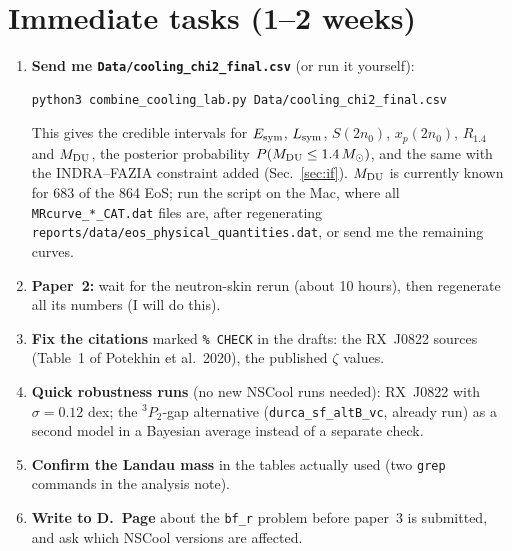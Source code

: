 \documentclass[11pt,a4paper]{article}
\newcommand{\Esym}{E_{\rm sym}}
\newcommand{\Lsym}{L_{\rm sym}}
\newcommand{\Msun}{M_\odot}
\begin{document}
\section{Immediate tasks (1--2 weeks)}
\begin{enumerate}[leftmargin=*]
\item \textbf{Send me \texttt{Data/cooling\_chi2\_final.csv}} (or run it yourself):
\begin{verbatim}
python3 combine_cooling_lab.py Data/cooling_chi2_final.csv
\end{verbatim}
This gives the credible intervals for $\Esym$, $\Lsym$, $S(2n_0)$, $x_p(2n_0)$, $R_{1.4}$ and $M_{\rm DU}$, the posterior probability $P(M_{\rm DU}\le1.4\,\Msun)$, and the same with the INDRA--FAZIA constraint added (Sec.~\ref{sec:if}). $M_{\rm DU}$ is currently known for 683 of the 864 EoS; run the script on the Mac, where all \texttt{MRcurve\_*\_CAT.dat} files are, after regenerating \texttt{reports/data/eos\_physical\_quantities.dat}, or send me the remaining curves.
\item \textbf{Paper~2:} wait for the neutron-skin rerun (about 10 hours), then regenerate all its numbers (I will do this).
\item \textbf{Fix the citations} marked \texttt{\% CHECK} in the drafts: the RX~J0822 sources (Table~1 of Potekhin et al.\ 2020), the published $\zeta$ values.
\item \textbf{Quick robustness runs} (no new NSCool runs needed): RX~J0822 with $\sigma=0.12$ dex; the $^3P_2$-gap alternative (\texttt{durca\_sf\_altB\_vc}, already run) as a second model in a Bayesian average instead of a separate check.
\item \textbf{Confirm the Landau mass} in the tables actually used (two \texttt{grep} commands in the analysis note).
\item \textbf{Write to D.~Page} about the \texttt{bf\_r} problem before paper~3 is submitted, and ask which NSCool versions are affected.
\end{enumerate}

\end{document}
